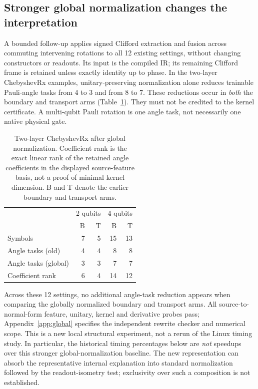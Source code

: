 \subsection{Stronger global normalization changes the interpretation}
\label{sec:globalresults}
A bounded follow-up applies signed Clifford extraction and fusion across
commuting intervening rotations to all 12 existing settings, without
changing constructors or readouts. Its input is the compiled IR; its
remaining Clifford frame is retained unless exactly identity up to
phase. In the two-layer ChebyshevRx examples, unitary-preserving
normalization alone reduces trainable Pauli-angle tasks from 4 to 3
and from 8 to 7. These reductions occur in \emph{both} the boundary and
transport arms (Table~\ref{tab:global}). They must not be credited to
the kernel certificate. A multi-qubit Pauli rotation is one angle task,
not necessarily one native physical gate.

\begin{table}[t]
\caption{Two-layer ChebyshevRx after global normalization.
Coefficient rank is the exact linear rank of the retained angle
coefficients in the displayed source-feature basis, not a proof of
minimal kernel dimension. B and T denote the earlier boundary and
transport arms.}
\label{tab:global}
\begin{tabular}{lrrrr}
& \multicolumn{2}{c}{2 qubits} & \multicolumn{2}{c}{4 qubits}\\
& B & T & B & T\\
\toprule
Symbols & 7 & 5 & 15 & 13\\
Angle tasks (old) & 4 & 4 & 8 & 8\\
Angle tasks (global) & 3 & 3 & 7 & 7\\
Coefficient rank & 6 & 4 & 14 & 12\\
\bottomrule
\end{tabular}
\end{table}

Across these 12 settings, no additional angle-task reduction appears
when comparing the globally normalized boundary and transport arms.
All source-to-normal-form feature, unitary, kernel and derivative
probes pass; Appendix~\ref{app:global} specifies the independent
rewrite checker and numerical scope. This is a new local structural
experiment, not a rerun of the Linux timing study. In particular,
the historical timing percentages below are \emph{not} speedups over
this stronger global-normalization baseline. The new representation
can absorb the representative internal explanation into standard
normalization followed by the readout-isometry test; exclusivity over
such a composition is not established.


